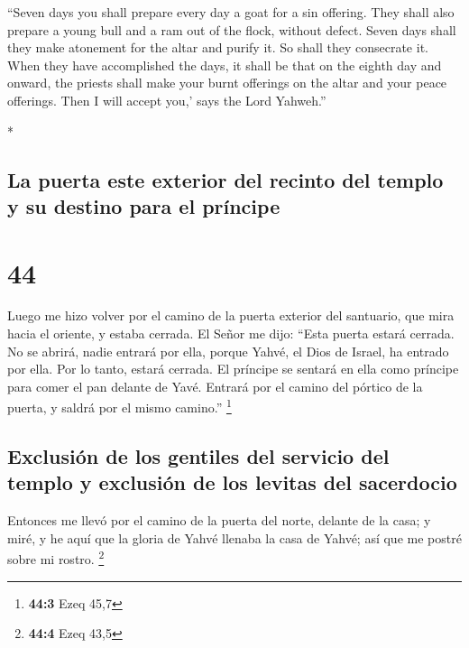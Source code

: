 \begin{paracol}{2}
\begin{otherlanguage}{english}
 ``Seven days you shall prepare every day a goat for a
sin offering. They shall also prepare a young bull and a ram out of the
flock, without defect.  Seven days shall they make
atonement for the altar and purify it. So shall they consecrate it.
 When they have accomplished the days, it shall be that
on the eighth day and onward, the priests shall make your burnt
offerings on the altar and your peace offerings. Then I will accept
you,' says the Lord Yahweh.''

\end{otherlanguage}

\switchcolumn[0]*

\hypertarget{la-puerta-este-exterior-del-recinto-del-templo-y-su-destino-para-el-pruxedncipe}{%
\subsection{La puerta este exterior del recinto del templo y su destino
para el
príncipe}\label{la-puerta-este-exterior-del-recinto-del-templo-y-su-destino-para-el-pruxedncipe}}

\hypertarget{section-86}{%
\section{44}\label{section-86}}

 Luego me hizo volver por el camino de la puerta exterior
del santuario, que mira hacia el oriente, y estaba cerrada.
 El Señor me dijo: ``Esta puerta estará cerrada. No se
abrirá, nadie entrará por ella, porque Yahvé, el Dios de Israel, ha
entrado por ella. Por lo tanto, estará cerrada.  El
príncipe se sentará en ella como príncipe para comer el pan delante de
Yavé. Entrará por el camino del pórtico de la puerta, y saldrá por el
mismo camino.'' \footnote{\textbf{44:3} Ezeq 45,7}

\hypertarget{exclusiuxf3n-de-los-gentiles-del-servicio-del-templo-y-exclusiuxf3n-de-los-levitas-del-sacerdocio}{%
\subsection{Exclusión de los gentiles del servicio del templo y
exclusión de los levitas del
sacerdocio}\label{exclusiuxf3n-de-los-gentiles-del-servicio-del-templo-y-exclusiuxf3n-de-los-levitas-del-sacerdocio}}

 Entonces me llevó por el camino de la puerta del norte,
delante de la casa; y miré, y he aquí que la gloria de Yahvé llenaba la
casa de Yahvé; así que me postré sobre mi rostro. \footnote{\textbf{44:4}
  Ezeq 43,5}


\end{paracol}

